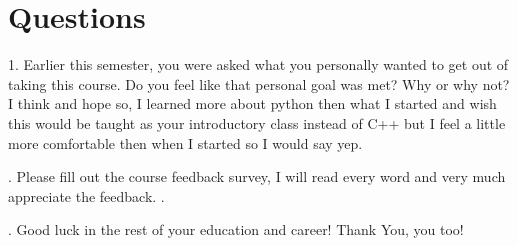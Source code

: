 \documentclass[12pt,a4paper]{article}
\begin{document}
\section{Questions}\label{sec:res}


1. Earlier this semester, you were asked what you personally wanted to get out of taking this
course. Do you feel like that personal goal was met? Why or why not?
\newline I think and hope so, I learned more about python then what I started and wish this would be taught as your introductory class instead of C++ but I feel a little more comfortable then when I started so I would say yep.


. Please fill out the course feedback survey, I will read every word and very much appreciate
the feedback. 
\newlineOk.
\noindent 


. Good luck in the rest of your education and career!
\newline Thank You, you too!
\



\end{document}
